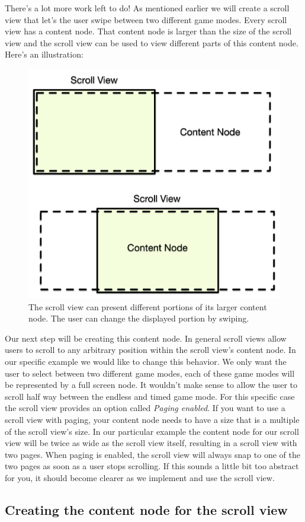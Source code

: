 There's a lot more work left to do! As mentioned earlier we will create a scroll
view that let's the user swipe between two different game modes. Every scroll
view has a content node. That content node is larger than the size of the scroll
view and the scroll view can be used to view different parts of this content
node. Here's an illustration:

\begin{figure}[H]
		\centering
		\includegraphics[width=0.5\linewidth]{images/Chapter7/scrollview_concept.png}
		\caption{The scroll view can present different portions of its larger content
		node. The user can change the displayed portion by swiping.}
\end{figure}

Our next step will be creating this content node. In general scroll views allow
users to scroll to any arbitrary position within the scroll view's content node.
In our specific example we would like to change this behavior. We only
want the user to select between two different game modes, each of these game modes will be
represented by a full screen node. It wouldn't make sense to allow the user to
scroll half way between the endless and timed game mode. For this specific case
the scroll view provides an option called \textit{Paging enabled}. If you want
to use a scroll view with paging, your content node needs to have a size that is
a multiple of the scroll view's size. In our particular example the content node
for our scroll view will be twice as wide as the scroll view itself, resulting
in a scroll view with two pages. When paging is enabled, the scroll view will
always snap to one of the two pages as soon as a user stops scrolling. If this
sounds a little bit too abstract for you, it should become clearer as we implement and use the scroll view.

\subsection{Creating the content node for the scroll view}

